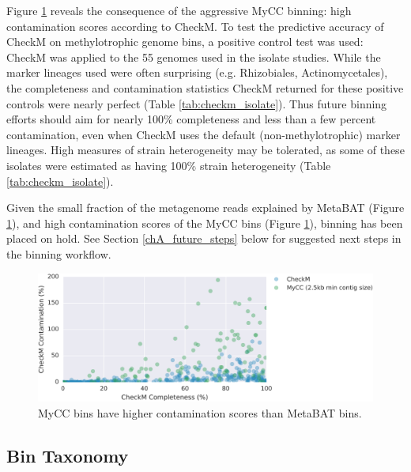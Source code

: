 Figure \ref{fig:mycc_contamination} reveals the consequence of the aggressive MyCC binning: high contamination scores according to CheckM.
To test the predictive accuracy of CheckM on methylotrophic genome bins, a positive control test was used: CheckM was applied to the 55 genomes used in the isolate studies.
While the marker lineages used were often surprising (e.g. Rhizobiales, Actinomycetales), the completeness and contamination statistics CheckM returned for these positive controls were nearly perfect (Table \ref{tab:checkm_isolate}).
Thus future binning efforts should aim for nearly 100\% completeness and less than a few percent contamination, even when CheckM uses the default (non-methylotrophic) marker lineages.
High measures of strain heterogeneity may be tolerated, as some of these isolates were estimated as having 100\% strain heterogeneity  (Table \ref{tab:checkm_isolate}).

Given the small fraction of the metagenome reads explained by MetaBAT (Figure \ref{fig:mycc_contamination}), and high contamination scores of the MyCC bins (Figure \ref{fig:mycc_contamination}), binning has been placed on hold.
See Section \ref{chA_future_steps} below for suggested next steps in the binning workflow.


\begin{figure}[H]
\centering
    \includegraphics[width=1.0\textwidth]{./tex/chapter2/figures/170202_MyCC_has_higher_contamination--cleaned.pdf}
    \begin{singlespace}
    \caption[MyCC bins have higher contamination scores than MetaBAT bins]{
        MyCC bins have higher contamination scores than MetaBAT bins.}
    \label{fig:mycc_contamination}
    \end{singlespace}
\end{figure}

\subsection{Bin Taxonomy}

